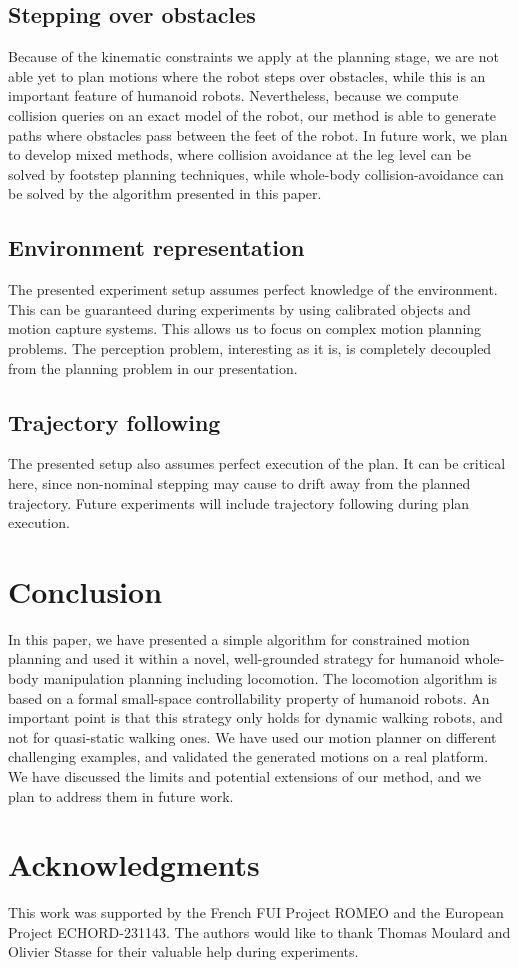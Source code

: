 \documentclass{article}
\begin{document}
\subsection{Stepping over obstacles}

Because of the kinematic constraints we apply at the planning stage, we are not
able yet to plan motions where the robot steps over obstacles, while this is an 
important feature of humanoid robots. Nevertheless, because we compute collision queries on
an exact model of the robot, our method is able to generate paths where obstacles
pass between the feet of the robot.
In future work, we plan to develop mixed
methods, where collision avoidance at the leg level can be solved by footstep
planning techniques, while whole-body collision-avoidance can be solved by the
algorithm presented in this paper.

\subsection{Environment representation}

The presented experiment setup assumes perfect knowledge of the environment. This can
be guaranteed during experiments by using calibrated objects and motion capture systems.
This allows us to focus on complex motion planning problems. The perception problem,
interesting as it is, is completely decoupled from the planning problem in our
presentation. 


\subsection{Trajectory following}

The presented setup also assumes perfect execution of the plan. It can be 
critical here, since
non-nominal stepping may cause to drift away from the planned trajectory. Future 
experiments will  include trajectory following during plan execution.

\section{Conclusion}

In this paper, we have presented a simple algorithm for constrained motion planning
and used it within a novel, well-grounded strategy for humanoid whole-body
manipulation planning including locomotion. The locomotion algorithm is based on a formal
small-space controllability property of humanoid robots. An important point is that
this strategy only holds for dynamic walking robots, and not for quasi-static walking ones.
We have used our motion planner on different challenging examples, and validated the
generated motions on a real platform. We have discussed the limits and potential extensions
of our method, and we plan to address them in future work.

\section{Acknowledgments}

This work was supported by the French FUI Project ROMEO and the European Project ECHORD-231143. The authors would like to thank Thomas Moulard and Olivier Stasse for their valuable help during experiments.


   



\end{document}
